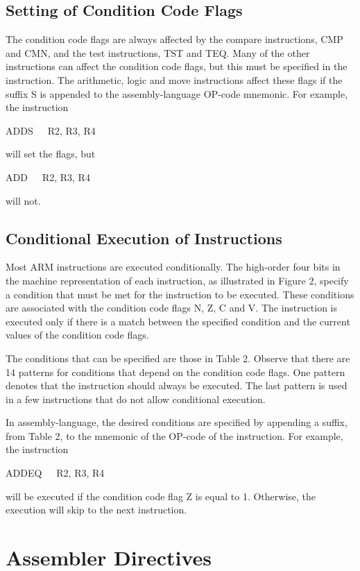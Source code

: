 \documentclass[11pt, twoside, pdftex]{article}
\begin{document}
\subsection{Setting of Condition Code Flags}
The condition code flags are always affected by the compare
instructions, CMP and CMN, and the test instructions, 
TST and TEQ. Many of the other instructions can affect the
condition code flags, but this must be specified in the
instruction. The arithmetic, logic and move instructions affect
these flags if the suffix S is appended to the assembly-language
OP-code mnemonic.
For example, the instruction
\begin{center}
ADDS~~~R2, R3, R4
\end{center}
\noindent
will set the flags, but
\begin{center}
ADD~~~R2, R3, R4
\end{center}
\noindent
will not.

\subsection{Conditional Execution of Instructions}

Most ARM instructions are executed conditionally. The high-order
four bits in the machine representation of each instruction,
as illustrated in Figure 2, specify a condition that must be met
for the instruction to be executed. These conditions are
associated with the condition code flags N, Z, C and V. 
The instruction is executed only if there is a match between
the specified condition and the current values of the condition
code flags.

The conditions that can be specified are those in Table 2.
Observe that there are 14 patterns for conditions that depend
on the condition code flags. One pattern denotes that the
instruction should always be executed. The last pattern is
used in a few instructions that do not allow conditional
execution.

In assembly-language, the desired conditions are specified
by appending a suffix, from Table 2, to the mnemonic of the
OP-code of the instruction. For example, the instruction
\begin{center}
ADDEQ~~~R2, R3, R4
\end{center}
\noindent
will be executed if the condition code flag Z is equal to 1. 
Otherwise, the execution will skip to the next instruction.


\section{Assembler Directives}
\end{document}
